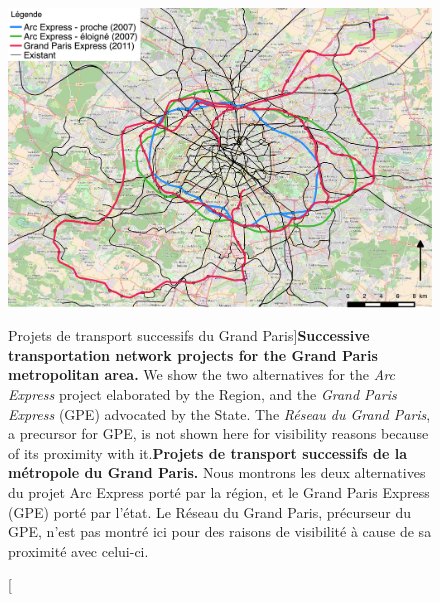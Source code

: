 {}



\begin{figure}[h!]
\includegraphics[width=\linewidth]{Figures/GrandParisRealEstate/reseaux}
\caption[][Projets de transport successifs du Grand Paris]{\textbf{Successive transportation network projects for the Grand Paris metropolitan area.} We show the two alternatives for the \emph{Arc Express} project elaborated by the Region, and the \emph{Grand Paris Express} (GPE) advocated by the State. The \emph{Réseau du Grand Paris}, a precursor for GPE, is not shown here for visibility reasons because of its proximity with it.\label{fig:projects}}{\textbf{Projets de transport successifs de la métropole du Grand Paris.} Nous montrons les deux alternatives du projet Arc Express porté par la région, et le Grand Paris Express (GPE) porté par l'état. Le Réseau du Grand Paris, précurseur du GPE, n'est pas montré ici pour des raisons de visibilité à cause de sa proximité avec celui-ci.\label{fig:projects}}
\end{figure}



